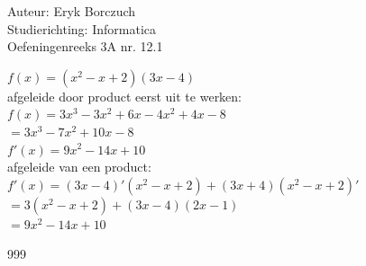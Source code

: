 \documentclass[a4paper]{article}
\begin{document}
  
\noindent \large Auteur: Eryk Borczuch \\
\noindent \large Studierichting: Informatica\\
\noindent \large Oefeningenreeks 3A nr. 12.1\\

\medskip

\normalsize

$f(x) = (x^2 -x +2)(3x -4)$\\

afgeleide door product eerst uit te werken:\\

$f(x)= 3x^3 -3x^2 +6x -4x^2 +4x -8$\\

$= 3x^3 -7x^2 + 10x -8$\\

$f'(x) = 9x^2 - 14x +10$\\

afgeleide van een product:\\

$f'(x) = (3x-4)'(x^2 -x +2)+ (3x+4)(x^2-x+2)'$\\

$= 3(x^2 -x +2)+(3x-4)(2x-1)$\\

$= 9x^2 - 14x +10$\\

\begin{thebibliography}{999}
\end{thebibliography}
\end{document}
